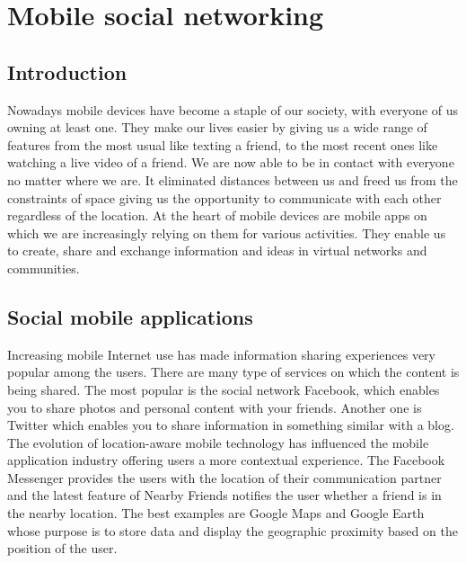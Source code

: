 \chapter{Mobile social networking}\label{chap1}
\thispagestyle{plain}

\section{Introduction}

Nowadays mobile devices have become a staple of our society, with everyone of
us owning at least one. They make our lives easier by giving us a wide range of
features from the most usual like texting a friend, to the most recent ones like
watching a live video of a friend. We are now able to be in contact with
everyone no matter where we are. It eliminated distances between us and
freed us from the constraints of space giving us the opportunity to communicate
with each other regardless of the location.
At the heart of mobile devices are mobile apps on which we are increasingly
relying on them for various activities. They enable us to create, share and
exchange information and ideas in virtual networks and communities.

\section{Social mobile applications}

Increasing mobile Internet use has made information sharing experiences very
popular among the users. There are many type of services on which the content is
being shared. The most popular is the social network Facebook, which enables you
to share photos and personal content with your friends. Another one is Twitter
which enables you to share information in something similar with a blog.
The evolution of location-aware mobile technology has influenced the mobile
application industry offering users a more contextual experience. The Facebook
Messenger provides the users with the location of their communication partner
and the latest feature of Nearby Friends notifies the user whether a friend is
in the nearby location. The best examples are Google Maps and Google Earth whose
purpose is to store data and display the geographic proximity based on the
position of the user.

